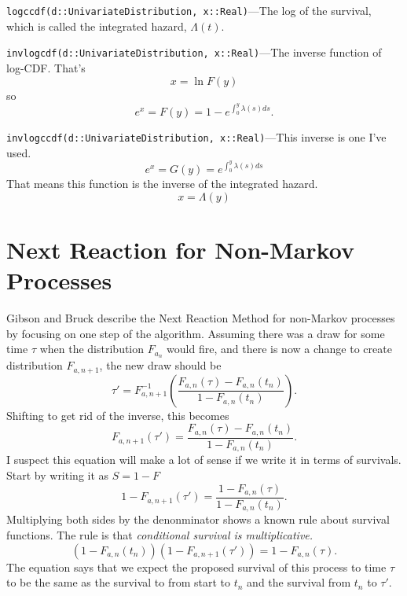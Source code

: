 \documentclass{article}
\begin{document}
\texttt{logccdf(d::UnivariateDistribution, x::Real)}---The log of the survival, which is called the integrated hazard, $\Lambda(t)$.

\texttt{invlogcdf(d::UnivariateDistribution, x::Real)}---The inverse function of log-CDF. That's
\begin{equation}
x = \ln F(y)
\end{equation}
so
\begin{equation}
e^x = F(y) = 1 - e^{\int_0^y\lambda(s)ds}.
\end{equation}

\texttt{invlogccdf(d::UnivariateDistribution, x::Real)}---This inverse is one I've used.
\begin{equation}
e^x = G(y) = e^{\int_0^y\lambda(s)ds}
\end{equation}
That means this function is the inverse of the integrated hazard.
\begin{equation}
x = \Lambda(y)
\end{equation}


\section{Next Reaction for Non-Markov Processes}

Gibson and Bruck describe the Next Reaction Method for non-Markov processes by focusing on one step of the algorithm. Assuming there was a draw for some time $\tau$ when the distribution $F_{a_n}$ would fire, and there is now a change to create distribution $F_{a,n+1}$, the new draw should be
\begin{equation}
	\tau'=F_{a,n+1}^{-1}\left(\frac{F_{a,n}(\tau) - F_{a,n}(t_n)}{1-F_{a,n}(t_n)}\right).
\end{equation}
Shifting to get rid of the inverse, this becomes
\begin{equation}
	F_{a,n+1}(\tau')=\frac{F_{a,n}(\tau) - F_{a,n}(t_n)}{1-F_{a,n}(t_n)}.
\end{equation}
I suspect this equation will make a lot of sense if we write it in terms of survivals. Start by writing it as $S=1-F$
\begin{equation}
	1-F_{a,n+1}(\tau')=\frac{1-F_{a,n}(\tau)}{1-F_{a,n}(t_n)}.
\end{equation}
Multiplying both sides by the denonminator shows a known rule about survival functions. The rule is that \emph{conditional survival is multiplicative.}
\begin{equation}
	\left(1-F_{a,n}(t_n)\right)\left(1-F_{a,n+1}(\tau')\right)=1-F_{a,n}(\tau).\label{eqn:survivalrule}
\end{equation}
The equation says that we expect the proposed survival of this process to time $\tau$ to be the same as the survival to from start to $t_n$ and the survival from $t_n$ to $\tau'$.
\end{document}

